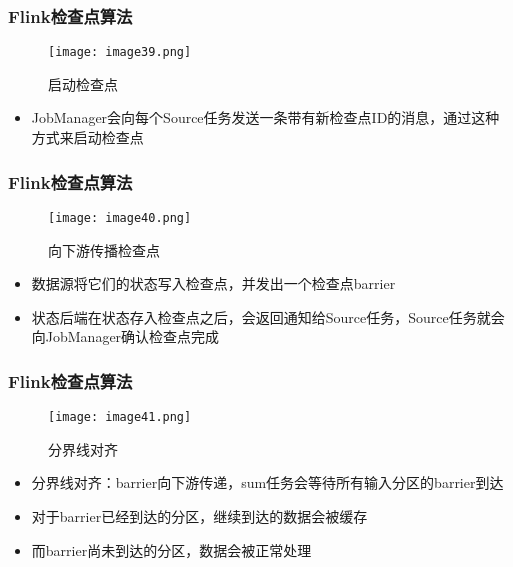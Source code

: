 \documentclass{beamer}
\begin{document}
  \begin{frame}
      \frametitle{Flink检查点算法}

      \begin{figure}
        \centering
        \texttt{[image: image39.png]}
        \caption{启动检查点}
      \end{figure}
  
      \begin{itemize}
          \item JobManager会向每个Source任务发送一条带有新检查点ID的消息，通过这种方式来启动检查点
      \end{itemize}
  
  \end{frame}

  \begin{frame}
      \frametitle{Flink检查点算法}

      \begin{figure}
        \centering
        \texttt{[image: image40.png]}
        \caption{向下游传播检查点}
      \end{figure}
  
      \begin{itemize}
          \item 数据源将它们的状态写入检查点，并发出一个检查点barrier
          \item 状态后端在状态存入检查点之后，会返回通知给Source任务，Source任务就会向JobManager确认检查点完成
      \end{itemize}
  
  \end{frame}

  \begin{frame}
      \frametitle{Flink检查点算法}

      \begin{figure}
        \centering
        \texttt{[image: image41.png]}
        \caption{分界线对齐}
      \end{figure}
  
      \begin{itemize}
          \item 分界线对齐：barrier向下游传递，sum任务会等待所有输入分区的barrier到达
          \item 对于barrier已经到达的分区，继续到达的数据会被缓存
          \item 而barrier尚未到达的分区，数据会被正常处理
      \end{itemize}
  
  \end{frame}
\end{document}
